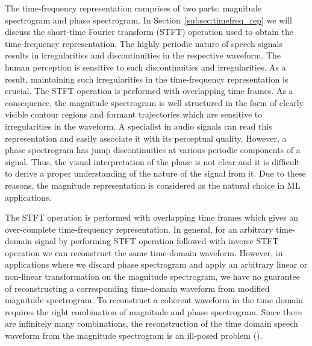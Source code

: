 The time-frequency representation comprises of two parts: magnitude spectrogram and phase spectrogram. In Section~\ref{subsec:timefreq_rep} we will discuss the short-time Fourier transform (STFT) operation used to obtain the time-frequency representation. The highly periodic nature of speech signals results in irregularities and discontinuities in the respective waveform. The human perception is sensitive to such discontinuities and irregularities. As a result, maintaining such irregularities in the time-frequency representation is crucial. The STFT operation is performed with overlapping time frames. As a consequence, the magnitude spectrogram is well structured in the form of clearly visible contour regions and formant trajectories which are sensitive to irregularities in the waveform. A specialist in audio signals can read this representation and easily associate it with its perceptual quality. However, a phase spectrogram has jump discontinuities at various periodic components of a signal. Thus, the visual interpretation of the phase is not clear and it is difficult to derive a proper understanding of the nature of the signal from it. Due to these reasons, the magnitude representation is considered as the natural choice in ML applications. 

The STFT operation is performed with overlapping time frames which gives an over-complete time-frequency representation. In general, for an arbitrary time-domain signal by performing STFT operation followed with inverse STFT operation we can reconstruct the same time-domain waveform. However, in applications where we discard phase spectrogram and apply an arbitrary linear or non-linear transformation on the magnitude spectrogram, we have no guarantee of reconstructing a corresponding time-domain waveform from modified magnitude spectrogram. To reconstruct a coherent waveform in the time domain requires the right combination of magnitude and phase spectrogram. Since there are infinitely many combinations, the reconstruction of the time domain speech waveform from the magnitude spectrogram is an ill-posed problem (\cite{jaganathan2015phase}).

